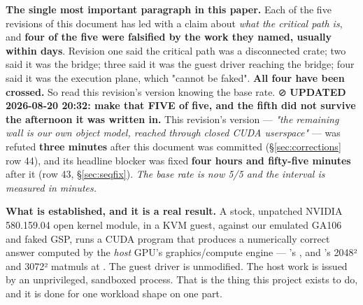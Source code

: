 \documentclass[10.5pt]{article}
\begin{document}
\begin{warnbox}
\small
\textbf{The single most important paragraph in this paper.} Each of the five revisions of this
document has led with a claim about \emph{what the critical path is}, and \textbf{four of the five
were falsified by the work they named, usually within days}. Revision one said the critical path
was a disconnected crate; two said it was the bridge; three said it was the guest driver reaching
the bridge; four said it was the execution plane, which "cannot be faked". \textbf{All four have
been crossed.} So read this revision's version knowing the base rate.
⊘ \textbf{UPDATED 2026-08-20 20:32: make that FIVE of five, and the fifth did not survive the
afternoon it was written in.} This revision's version --- \emph{"the remaining wall is our own
object model, reached through closed CUDA userspace"} --- was refuted \textbf{three minutes} after
this document was committed (\S\ref{sec:corrections} row 44), and its headline blocker was fixed
\textbf{four hours and fifty-five minutes} after it (row 43, \S\ref{sec:seqfix}).
\emph{The base rate is now 5/5 and the interval is measured in minutes.}

\smallskip
\textbf{What is established, and it is a real result.} A stock, unpatched NVIDIA 580.159.04 open
kernel module, in a KVM guest, against our emulated GA106 and faked GSP, runs a CUDA program that
produces a numerically correct answer computed by the \emph{host} GPU's graphics/compute engine —
's , and 's 2048² and 3072² matmuls at . The
guest driver is unmodified. The host work is issued by an unprivileged, sandboxed process. That is
the thing this project exists to do, and it is done for one workload shape on one part.


\end{warnbox}
\end{document}
